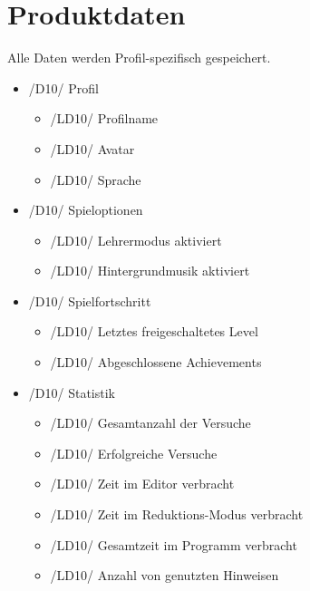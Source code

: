 \section{Produktdaten}

Alle Daten werden Profil-spezifisch gespeichert.

\begin{itemize}

\item /D10/ Profil
\begin{itemize}
\item /LD10/ Profilname
\item /LD10/ Avatar
\item /LD10/ Sprache
\end{itemize}

\item /D10/ Spieloptionen
\begin{itemize}
\item /LD10/ Lehrermodus aktiviert
\item /LD10/ Hintergrundmusik aktiviert
\end{itemize}

\item /D10/ Spielfortschritt
\begin{itemize}
\item /LD10/ Letztes freigeschaltetes Level
\item /LD10/ Abgeschlossene Achievements
\end{itemize}

\item /D10/ Statistik
\begin{itemize}
\item /LD10/ Gesamtanzahl der Versuche
\item /LD10/ Erfolgreiche Versuche
\item /LD10/ Zeit im Editor verbracht
\item /LD10/ Zeit im Reduktions-Modus verbracht
\item /LD10/ Gesamtzeit im Programm verbracht
\item /LD10/ Anzahl von genutzten Hinweisen
\end{itemize}

\end{itemize}